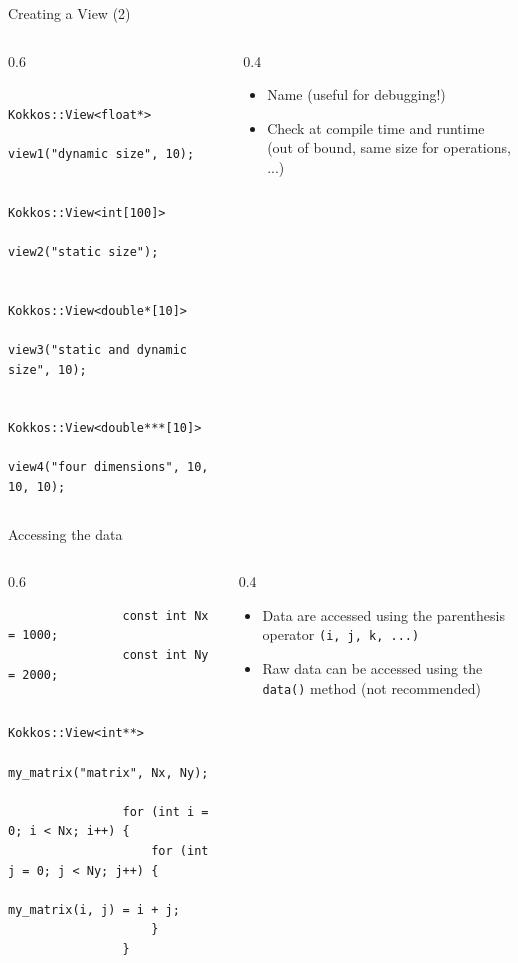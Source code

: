 \documentclass[
    aspectratio=169,
]{beamer}
\begin{document}
\begin{frame}[fragile]{Creating a View (2)}
    \begin{columns}
        \begin{column}{0.6\linewidth}
            \begin{verbatim}
                Kokkos::View<float*>
                    view1("dynamic size", 10);

                Kokkos::View<int[100]>
                    view2("static size");

                Kokkos::View<double*[10]>
                    view3("static and dynamic size", 10);

                Kokkos::View<double***[10]>
                    view4("four dimensions", 10, 10, 10);
            \end{verbatim}
        \end{column}
        \begin{column}{0.4\linewidth}
            \begin{itemize}
                \item Name (useful for debugging!)
                \item Check at compile time and runtime (out of bound, same size for operations, ...)
            \end{itemize}
        \end{column}
    \end{columns}
\end{frame}

\begin{frame}[fragile]{Accessing the data}
    \begin{columns}
        \begin{column}{0.6\linewidth}
            \begin{verbatim}
                const int Nx = 1000;
                const int Ny = 2000;

                Kokkos::View<int**>
                    my_matrix("matrix", Nx, Ny);

                for (int i = 0; i < Nx; i++) {
                    for (int j = 0; j < Ny; j++) {
                        my_matrix(i, j) = i + j;
                    }
                }
            \end{verbatim}
        \end{column}
        \begin{column}{0.4\linewidth}
            \begin{itemize}
                \item Data are accessed using the parenthesis operator \texttt{(i, j, k, ...)}
                \item Raw data can be accessed using the \texttt{data()} method (not recommended)
            \end{itemize}
        \end{column}
    \end{columns}
\end{frame}
\end{document}
